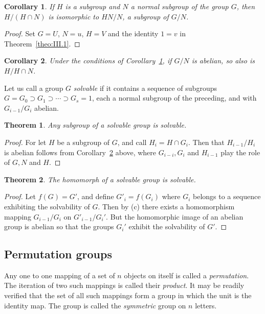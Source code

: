 \documentclass[10pt,leqno]{article}
\newtheorem{theo}{Theorem}
\newtheorem{coro}{Corollary}
\theoremstyle{definition}
\begin{document}
\begin{coro}
\label{coro:III.1}
If $H$ is a subgroup and $N$ a normal subgroup of the group $G$, then $H / (H \cap N)$ is isomorphic to $HN/N$, a subgroup of $G/N$.
\end{coro}

\begin{proof}
Set $G = U$, $N = u$, $H = V$ and the identity $1 = v$ in Theorem~\ref{theo:III.1}.
\end{proof}


\begin{coro}
\label{coro:III.2}
Under the conditions of Corollary~\ref{coro:III.1}, if $G/N$ is abelian, so also is $H/H \cap N$.
\end{coro}


Let us call a group $G$ \emph{solvable} if it contains a sequence of subgroups $G = G_0 \supset G_1 \supset \cdots \supset G_s = 1$, each a normal subgroup of the preceding, and with $G_{i-1}/G_i$ abelian.


\begin{theo}
\label{theo:III.2}
Any subgroup of a solvable group is solvable.
\end{theo}

\begin{proof}
For let $H$ be a subgroup of $G$, and call $H_i = H \cap G_i$.
Then that $H_{i-1}/H_i$ is abelian follows from Corollary~\ref{coro:III.2} above, where $G_{i-i}, G_i$ and $H_{i-1}$ play the role of $G, N$ and $H$.
\end{proof}


\begin{theo}
\label{theo:III.3}
The homomorph of a solvable group is solvable.
\end{theo}

\begin{proof}
Let $f(G) = G'$, and define $G'_i = f(G_i)$ where $G_i$ belongs to a sequence exhibiting the solvability of $G$.
Then by (c) there exists a homomorphism mapping $G_{i-1}/G_i$ on $G'_{i-1} / G_i'$.
But the homomorphic image of an abelian group is abelian so that the groups $G_i'$ exhibit the solvability of $G'$.
\end{proof}


\subsection{Permutation groups}

Any one to one mapping of a set of $n$ objects on itself is called a \emph{permutation}.
The iteration of two such mappings is called their \emph{product}.
It may be readily verified that the set of all such mappings form a group in which the unit is the identity map.
The group is called the \emph{symmetric} group on $n$ letters.
\end{document}
